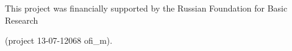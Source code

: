 \Ack

\noindent

This project was financially supported by the Russian Foundation for Basic Research

(project 13-07-12068 ofi\_m).

















\renewcommand{\bibname}{\protect\rmfamily References}




